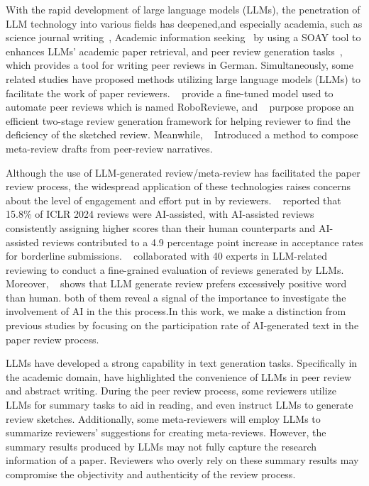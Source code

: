 With the rapid development of large language models (LLMs), the penetration of LLM technology into various fields has deepened,and especially academia, such as science journal writing~\cite{jiang2024llm}, Academic information seeking~\cite{wang2024solution} by using a SOAY tool to enhances LLMs' academic paper retrieval, and peer review generation tasks~\cite{su-etal-2023-reviewriter},
which provides a tool for writing peer reviews in German.
Simultaneously, some related studies have proposed methods utilizing large language models (LLMs) to facilitate the work of paper reviewers.
~\cite{weber2024other} provide a fine-tuned model used to automate peer reviews which is named RoboReviewe,
and ~\cite{gao2024reviewer2optimizingreviewgeneration} purpose propose an efficient two-stage review generation framework for helping reviewer to find the deficiency of the sketched review.
Meanwhile, ~\cite{santu2024promptingllmscomposemetareview} Introduced a method to compose meta-review drafts from peer-review narratives.

Although the use of LLM-generated review/meta-review has facilitated the paper review process,
the widespread application of these technologies raises concerns about the level of engagement and
effort put in by reviewers. 
~\cite{jin-etal-2024-agentreview} reported that 15.8\% of ICLR 2024 reviews were AI-assisted, with AI-assisted reviews consistently assigning higher scores than their human counterparts and AI-assisted reviews contributed to a 4.9 percentage point increase in acceptance rates for borderline submissions.
~\cite{du-etal-2024-llms} collaborated with 40 experts in LLM-related reviewing to conduct a fine-grained evaluation of reviews generated by LLMs.
Moreover, ~\cite{zhou-etal-2024-llm} shows that LLM generate review prefers excessively positive word than human.
both of them reveal a signal of the importance to investigate the involvement of AI in the this process.In this work, we make a distinction from previous studies by focusing on the participation rate of AI-generated text in the paper review process.

LLMs have developed a strong capability in text generation tasks. Specifically in the academic domain, \cite{birhane2023science} have highlighted the convenience of LLMs in peer review and abstract writing. During the peer review process, some reviewers utilize LLMs for summary tasks to aid in reading, and even instruct LLMs to generate review sketches\cite{zou2024chatgpt}. Additionally, some meta-reviewers will employ LLMs to summarize reviewers' suggestions for creating meta-reviews\cite{santu2024prompting}. However, the summary results produced by LLMs may not fully capture the research information of a paper. Reviewers who overly rely on these summary results may compromise the objectivity and authenticity of the review process.

